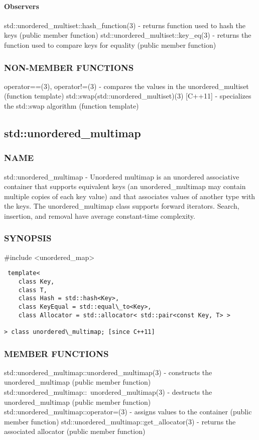 \paragraph{Observers}
std::unordered\_multiset::hash\_function(3) - returns function used to hash the keys   (public member function)
std::unordered\_multiset::key\_eq(3) - returns the function used to compare keys for equality   (public member function)

\subsubsection{NON-MEMBER FUNCTIONS}
operator==(3), operator!=(3) - compares the values in the unordered\_multiset   (function template)
std::swap(std::unordered\_multiset)(3) [C++11] - specializes the std::swap algorithm   (function template)


\subsection{std::unordered\_multimap}

\subsubsection{NAME}
std::unordered\_multimap - Unordered multimap is an unordered associative container that supports equivalent keys (an unordered\_multimap may contain multiple copies of each key value) and that associates values of another type with the keys. The unordered\_multimap class supports forward iterators. Search, insertion, and removal have average constant-time complexity.

\subsubsection{SYNOPSIS}
\#include <unordered\_map>

\begin{lstlisting}
 template<
    class Key,
    class T,
    class Hash = std::hash<Key>,
    class KeyEqual = std::equal\_to<Key>,
    class Allocator = std::allocator< std::pair<const Key, T> >

> class unordered\_multimap; [since C++11]
\end{lstlisting}

\subsubsection{MEMBER FUNCTIONS}
std::unordered\_multimap::unordered\_multimap(3) - constructs the unordered\_multimap  (public member function)
std::unordered\_multimap::~unordered\_multimap(3) - destructs the unordered\_multimap  (public member function)
std::unordered\_multimap::operator=(3) - assigns values to the container   (public member function)
std::unordered\_multimap::get\_allocator(3) - returns the associated allocator   (public member function)
